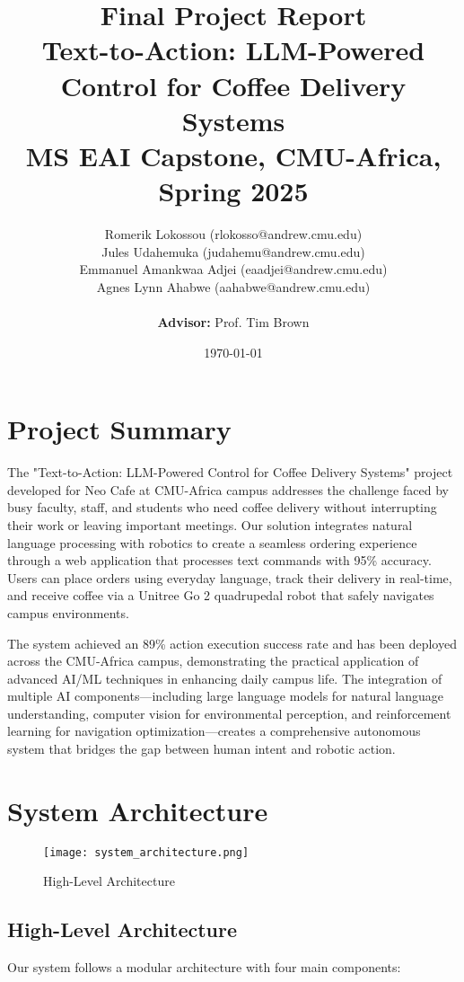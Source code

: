\documentclass[12pt]{article}
\title{Final Project Report\\
\Large Text-to-Action: LLM-Powered Control for Coffee Delivery Systems\\
\normalsize MS EAI Capstone, CMU-Africa, Spring 2025}
\author{
Romerik Lokossou (rlokosso@andrew.cmu.edu)\\
Jules Udahemuka (judahemu@andrew.cmu.edu)\\
Emmanuel Amankwaa Adjei (eaadjei@andrew.cmu.edu)\\
Agnes Lynn Ahabwe (aahabwe@andrew.cmu.edu)\\
\\
\textbf{Advisor:} Prof. Tim Brown
}
\date{\today}
\begin{document}
\maketitle
\newpage

\section{Project Summary}

The "Text-to-Action: LLM-Powered Control for Coffee Delivery Systems" project developed for Neo Cafe at CMU-Africa campus addresses the challenge faced by busy faculty, staff, and students who need coffee delivery without interrupting their work or leaving important meetings. Our solution integrates natural language processing with robotics to create a seamless ordering experience through a web application that processes text commands with 95\% accuracy. Users can place orders using everyday language, track their delivery in real-time, and receive coffee via a Unitree Go 2 quadrupedal robot that safely navigates campus environments. 

The system achieved an 89\% action execution success rate and has been deployed across the CMU-Africa campus, demonstrating the practical application of advanced AI/ML techniques in enhancing daily campus life. The integration of multiple AI components—including large language models for natural language understanding, computer vision for environmental perception, and reinforcement learning for navigation optimization—creates a comprehensive autonomous system that bridges the gap between human intent and robotic action.

\section{System Architecture}

\begin{figure}[h]
    \centering
    \texttt{[image: system\_architecture.png]}
    \caption{High-Level Architecture}
    \label{fig:enter-label}
\end{figure}
\subsection{High-Level Architecture}

Our system follows a modular architecture with four main components:
\end{document}
